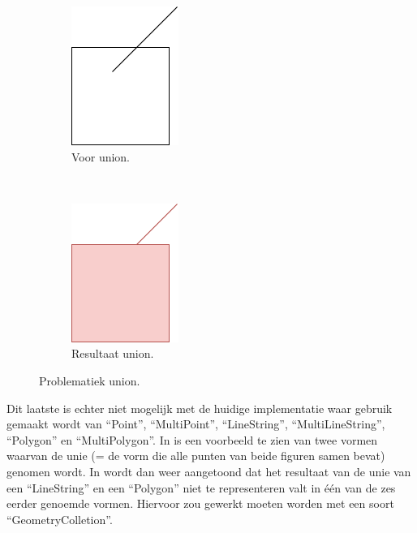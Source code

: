 \begin{figure}
    \centering
    \begin{subfigure}[t]{0.5\linewidth}
        \centering
        \includegraphics[width=0.3\linewidth]{images/union_example1.png}
        \caption{Voor union.}
        \label{fig:union_example1}
    \end{subfigure}%
    ~ 
    \begin{subfigure}[t]{0.5\linewidth}
        \centering
        \includegraphics[width=0.3\linewidth]{images/union_example2.png}
        \caption{Resultaat union.}
        \label{fig:union_example2}
    \end{subfigure}
    \caption{Problematiek union.}
\end{figure}

Dit laatste is echter niet mogelijk met de huidige implementatie waar gebruik gemaakt wordt van ``Point'', ``MultiPoint'', ``LineString'', ``MultiLineString'', ``Polygon'' en ``MultiPolygon''. In  is een voorbeeld te zien van twee vormen waarvan de unie (= de vorm die alle punten van beide figuren samen bevat) genomen wordt. In  wordt dan weer aangetoond dat het resultaat van de unie van een ``LineString'' en een ``Polygon'' niet te representeren valt in één van de zes eerder genoemde vormen. Hiervoor zou gewerkt moeten worden met een soort ``GeometryColletion''.